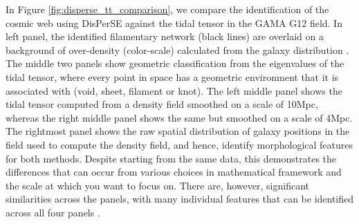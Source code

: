 In Figure \ref{fig:disperse_tt_comparison}, we compare the identification of the cosmic web using DisPerSE against the tidal tensor in the GAMA G12 field. In left panel, the identified filamentary network (black lines) are overlaid on a background of over-density (color-scale) calculated from the galaxy distribution \citep[taken from][]{kraljic2018}. The middle two panels show geometric classification from the eigenvalues of the tidal tensor, where every point in space has a geometric environment that it is associated with (void, sheet, filament or knot). The left middle panel shows the tidal tensor computed from a density field smoothed on a scale of 10Mpc, whereas the right middle panel shows the same but smoothed on a scale of 4Mpc. The rightmost panel shows the raw spatial distribution of galaxy positions in the field used to compute the density field, and hence, identify morphological features for both methods. Despite starting from the same data, this demonstrates the differences that can occur from various choices in mathematical framework and the scale at which you want to focus on. There are, however, significant similarities across the panels, with many individual features that can be identified across all four panels \citep[also see Figure 4 in][]{libeskind2018}. 

